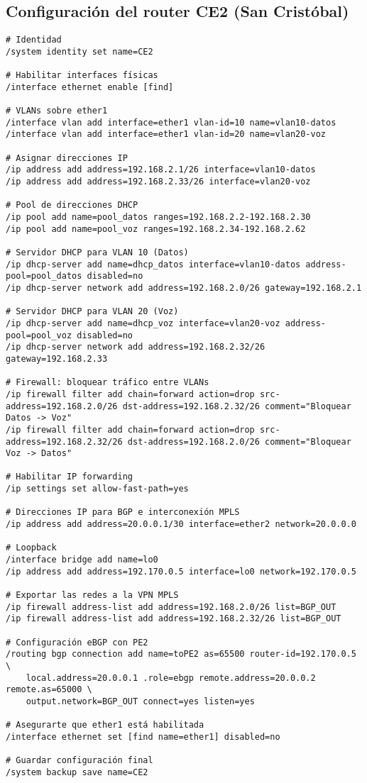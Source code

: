 \subsection{Configuración del router CE2 (San Cristóbal)}
\label{Apendice2:configuracion_ce2_san_cristobal}
\begin{lstlisting}[language=RouterOS]
# Identidad
/system identity set name=CE2

# Habilitar interfaces físicas
/interface ethernet enable [find]

# VLANs sobre ether1
/interface vlan add interface=ether1 vlan-id=10 name=vlan10-datos
/interface vlan add interface=ether1 vlan-id=20 name=vlan20-voz

# Asignar direcciones IP
/ip address add address=192.168.2.1/26 interface=vlan10-datos
/ip address add address=192.168.2.33/26 interface=vlan20-voz

# Pool de direcciones DHCP
/ip pool add name=pool_datos ranges=192.168.2.2-192.168.2.30
/ip pool add name=pool_voz ranges=192.168.2.34-192.168.2.62

# Servidor DHCP para VLAN 10 (Datos)
/ip dhcp-server add name=dhcp_datos interface=vlan10-datos address-pool=pool_datos disabled=no
/ip dhcp-server network add address=192.168.2.0/26 gateway=192.168.2.1

# Servidor DHCP para VLAN 20 (Voz)
/ip dhcp-server add name=dhcp_voz interface=vlan20-voz address-pool=pool_voz disabled=no
/ip dhcp-server network add address=192.168.2.32/26 gateway=192.168.2.33

# Firewall: bloquear tráfico entre VLANs
/ip firewall filter add chain=forward action=drop src-address=192.168.2.0/26 dst-address=192.168.2.32/26 comment="Bloquear Datos -> Voz"
/ip firewall filter add chain=forward action=drop src-address=192.168.2.32/26 dst-address=192.168.2.0/26 comment="Bloquear Voz -> Datos"

# Habilitar IP forwarding
/ip settings set allow-fast-path=yes

# Direcciones IP para BGP e interconexión MPLS
/ip address add address=20.0.0.1/30 interface=ether2 network=20.0.0.0

# Loopback
/interface bridge add name=lo0
/ip address add address=192.170.0.5 interface=lo0 network=192.170.0.5

# Exportar las redes a la VPN MPLS
/ip firewall address-list add address=192.168.2.0/26 list=BGP_OUT
/ip firewall address-list add address=192.168.2.32/26 list=BGP_OUT

# Configuración eBGP con PE2
/routing bgp connection add name=toPE2 as=65500 router-id=192.170.0.5 \
    local.address=20.0.0.1 .role=ebgp remote.address=20.0.0.2 remote.as=65000 \
    output.network=BGP_OUT connect=yes listen=yes

# Asegurarte que ether1 está habilitada
/interface ethernet set [find name=ether1] disabled=no

# Guardar configuración final
/system backup save name=CE2
\end{lstlisting}

